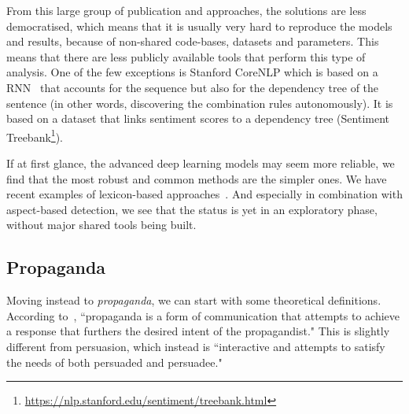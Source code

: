 
From this large group of publication and approaches, the solutions are less democratised, which means that it is usually very hard to reproduce the models and results, because of non-shared code-bases, datasets and parameters.
This means that there are less publicly available tools that perform this type of analysis.
One of the few exceptions is Stanford CoreNLP which is based on a RNN~\citep{socher2013recursive} that accounts for the sequence but also for the dependency tree of the sentence (in other words, discovering the combination rules autonomously). It is based on a dataset that links sentiment scores to a dependency tree (Sentiment Treebank\footnote{\url{https://nlp.stanford.edu/sentiment/treebank.html}}).

If at first glance, the advanced deep learning models may seem more reliable, we find that the most robust and common methods are the simpler ones.
We have recent examples of lexicon-based approaches~\citep{okango2022dictionary,mitra2020sentiment}.
And especially in combination with aspect-based detection, we see that the status is yet in an exploratory phase, without major shared tools being built.

\subsection{\statusgreen Propaganda}
\label{sec:lit_propaganda}

Moving instead to \emph{propaganda}, we can start with some theoretical definitions.
According to~\cite{jowett2012propaganda}, ``propaganda  is  a  form  of  communication  that  attempts  to  achieve a  response  that  furthers  the  desired  intent  of  the  propagandist." This is slightly different from persuasion, which instead is ``interactive and attempts to satisfy the needs of both persuaded and persuadee."  %





